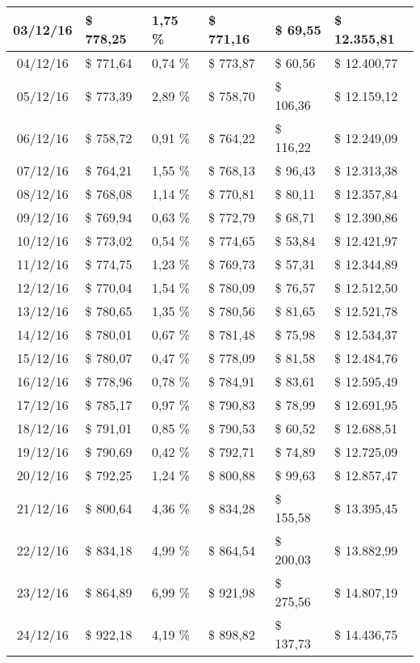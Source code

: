 \begin{small}
\begin{longtable}{|c|l|l|l|l|l|}
03/12/16 & \$ 778,25 & 1,75 \% & \$ 771,16 & \$ 69,55 & \$ 12.355,81 \\ \hline
04/12/16 & \$ 771,64 & 0,74 \% & \$ 773,87 & \$ 60,56 & \$ 12.400,77 \\ \hline
05/12/16 & \$ 773,39 & 2,89 \% & \$ 758,70 & \$ 106,36 & \$ 12.159,12 \\ \hline
06/12/16 & \$ 758,72 & 0,91 \% & \$ 764,22 & \$ 116,22 & \$ 12.249,09 \\ \hline
07/12/16 & \$ 764,21 & 1,55 \% & \$ 768,13 & \$ 96,43 & \$ 12.313,38 \\ \hline
08/12/16 & \$ 768,08 & 1,14 \% & \$ 770,81 & \$ 80,11 & \$ 12.357,84 \\ \hline
09/12/16 & \$ 769,94 & 0,63 \% & \$ 772,79 & \$ 68,71 & \$ 12.390,86 \\ \hline
10/12/16 & \$ 773,02 & 0,54 \% & \$ 774,65 & \$ 53,84 & \$ 12.421,97 \\ \hline
11/12/16 & \$ 774,75 & 1,23 \% & \$ 769,73 & \$ 57,31 & \$ 12.344,89 \\ \hline
12/12/16 & \$ 770,04 & 1,54 \% & \$ 780,09 & \$ 76,57 & \$ 12.512,50 \\ \hline
13/12/16 & \$ 780,65 & 1,35 \% & \$ 780,56 & \$ 81,65 & \$ 12.521,78 \\ \hline
14/12/16 & \$ 780,01 & 0,67 \% & \$ 781,48 & \$ 75,98 & \$ 12.534,37 \\ \hline
15/12/16 & \$ 780,07 & 0,47 \% & \$ 778,09 & \$ 81,58 & \$ 12.484,76 \\ \hline
16/12/16 & \$ 778,96 & 0,78 \% & \$ 784,91 & \$ 83,61 & \$ 12.595,49 \\ \hline
17/12/16 & \$ 785,17 & 0,97 \% & \$ 790,83 & \$ 78,99 & \$ 12.691,95 \\ \hline
18/12/16 & \$ 791,01 & 0,85 \% & \$ 790,53 & \$ 60,52 & \$ 12.688,51 \\ \hline
19/12/16 & \$ 790,69 & 0,42 \% & \$ 792,71 & \$ 74,89 & \$ 12.725,09 \\ \hline
20/12/16 & \$ 792,25 & 1,24 \% & \$ 800,88 & \$ 99,63 & \$ 12.857,47 \\ \hline
21/12/16 & \$ 800,64 & 4,36 \% & \$ 834,28 & \$ 155,58 & \$ 13.395,45 \\ \hline
22/12/16 & \$ 834,18 & 4,99 \% & \$ 864,54 & \$ 200,03 & \$ 13.882,99 \\ \hline
23/12/16 & \$ 864,89 & 6,99 \% & \$ 921,98 & \$ 275,56 & \$ 14.807,19 \\ \hline
24/12/16 & \$ 922,18 & 4,19 \% & \$ 898,82 & \$ 137,73 & \$ 14.436,75 \\ \hline

\end{longtable}
\end{small}
